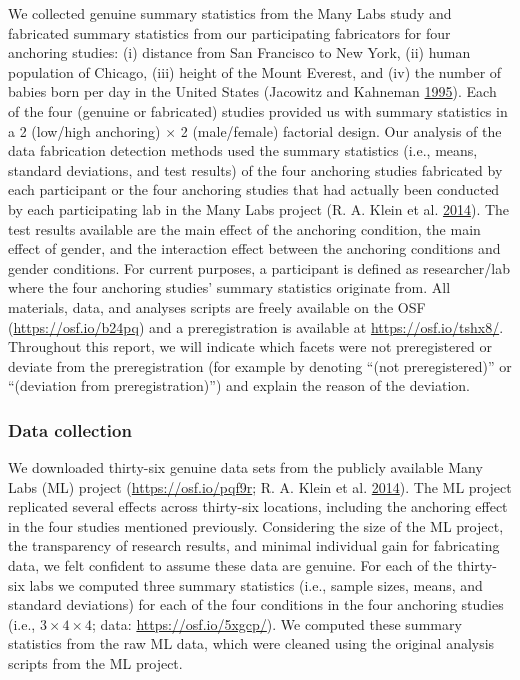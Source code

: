 \documentclass[a5paper]{book}
\begin{document}
We collected genuine summary statistics from the Many Labs study and
fabricated summary statistics from our participating fabricators for
four anchoring studies: (i) distance from San Francisco to New York,
(ii) human population of Chicago, (iii) height of the Mount Everest, and
(iv) the number of babies born per day in the United States (Jacowitz
and Kahneman
\protect\hyperlink{ref-doi:10.1037ux2fe722982011-058}{1995}). Each of
the four (genuine or fabricated) studies provided us with summary
statistics in a 2 (low/high anchoring) \(\times\) 2 (male/female)
factorial design. Our analysis of the data fabrication detection methods
used the summary statistics (i.e., means, standard deviations, and test
results) of the four anchoring studies fabricated by each participant or
the four anchoring studies that had actually been conducted by each
participating lab in the Many Labs project (R. A. Klein et al.
\protect\hyperlink{ref-doi:10.1027ux2f1864-9335ux2fa000178}{2014}). The
test results available are the main effect of the anchoring condition,
the main effect of gender, and the interaction effect between the
anchoring conditions and gender conditions. For current purposes, a
participant is defined as researcher/lab where the four anchoring
studies' summary statistics originate from. All materials, data, and
analyses scripts are freely available on the OSF
(\url{https://osf.io/b24pq}) and a preregistration is available at
\url{https://osf.io/tshx8/}. Throughout this report, we will indicate
which facets were not preregistered or deviate from the preregistration
(for example by denoting \enquote{(not preregistered)} or
\enquote{(deviation from preregistration)}) and explain the reason of
the deviation.

\subsubsection{Data collection}\label{data-collection}

We downloaded thirty-six genuine data sets from the publicly available
Many Labs (ML) project (\url{https://osf.io/pqf9r}; R. A. Klein et al.
\protect\hyperlink{ref-doi:10.1027ux2f1864-9335ux2fa000178}{2014}). The
ML project replicated several effects across thirty-six locations,
including the anchoring effect in the four studies mentioned previously.
Considering the size of the ML project, the transparency of research
results, and minimal individual gain for fabricating data, we felt
confident to assume these data are genuine. For each of the thirty-six
labs we computed three summary statistics (i.e., sample sizes, means,
and standard deviations) for each of the four conditions in the four
anchoring studies (i.e., \(3\times4\times4\); data:
\url{https://osf.io/5xgcp/}). We computed these summary statistics from
the raw ML data, which were cleaned using the original analysis scripts
from the ML project.
\end{document}
